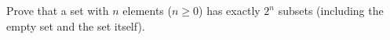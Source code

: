 Prove that a set with $n$ elements ($n\ge0$) has exactly $2^n$ subsets (including the empty set and the set itself).
